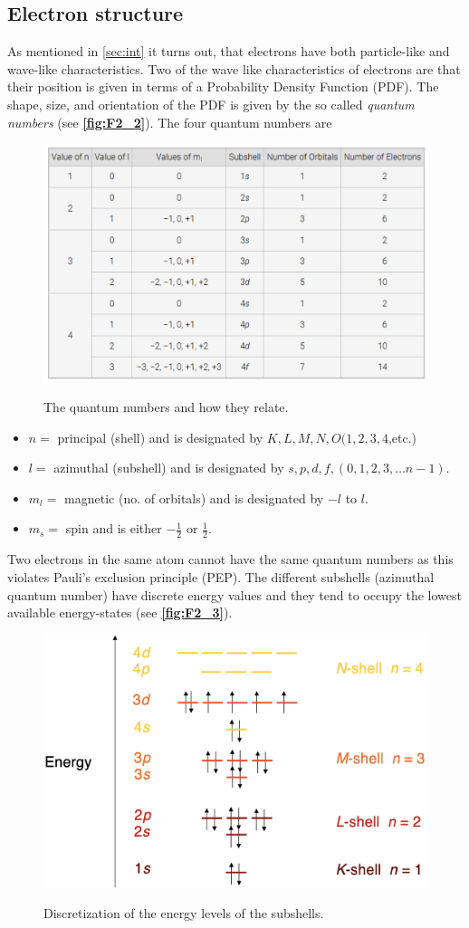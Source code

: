 \subsection{Electron structure}
As mentioned in \autoref{sec:int} it turns out, that electrons have both particle-like and wave-like characteristics. Two of the wave like characteristics of electrons are that their position is given in terms of a Probability Density Function (PDF). The shape, size, and orientation of the PDF is given by the so called \textit{quantum numbers} (see \textbf{\autoref{fig:F2_2}}). The four quantum numbers are
\begin{figure} [ht]
  \centering
  \caption{The quantum numbers and how they relate.}
  \includegraphics[width=0.65\linewidth]{./figures/F2_2.png}
  \label{fig:F2_2}
\end{figure}
\begin{itemize}
  \item $n = $ principal (shell) and is designated by $K, L, M, N, O (1, 2, 3, 4$,etc.)
  \item $l =$ azimuthal (subshell) and is designated by $s, p, d, f, (0, 1, 2, 3, \ldots n-1)$.
  \item $m_l = $ magnetic (no. of orbitals) and is designated by $-l$ to $l$.
  \item $m_s =$ spin and is either $-\frac{1}{2}$ or $\frac{1}{2}$.
\end{itemize}
Two electrons in the same atom cannot have the same quantum numbers as this violates Pauli's exclusion principle (PEP). The different subshells (azimuthal quantum number) have discrete energy values and they tend to occupy the lowest available energy-states (see \textbf{\autoref{fig:F2_3}}).
\begin{figure} [ht]
  \centering
  \caption{Discretization of the energy levels of the subshells.}
  \includegraphics[width=0.55\linewidth]{./figures/F2_3.png}
  \label{fig:F2_3}
\end{figure}
